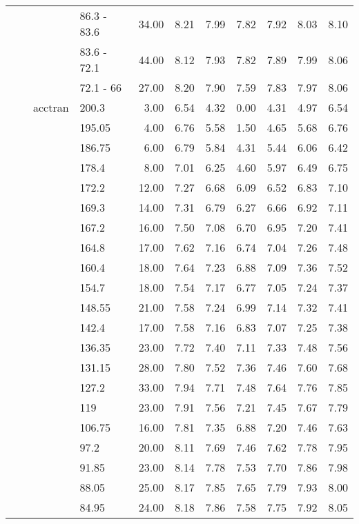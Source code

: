 \begin{longtable}{llllrrrrrrr}
   &  &  & 86.3 - 83.6 & 34.00 & 8.21 & 7.99 & 7.82 & 7.92 & 8.03 & 8.10 \\ 
   &  &  & 83.6 - 72.1 & 44.00 & 8.12 & 7.93 & 7.82 & 7.89 & 7.99 & 8.06 \\ 
   &  &  & 72.1 - 66 & 27.00 & 8.20 & 7.90 & 7.59 & 7.83 & 7.97 & 8.06 \\ 
   &  & acctran & 200.3 & 3.00 & 6.54 & 4.32 & 0.00 & 4.31 & 4.97 & 6.54 \\ 
   &  &  & 195.05 & 4.00 & 6.76 & 5.58 & 1.50 & 4.65 & 5.68 & 6.76 \\ 
   &  &  & 186.75 & 6.00 & 6.79 & 5.84 & 4.31 & 5.44 & 6.06 & 6.42 \\ 
   &  &  & 178.4 & 8.00 & 7.01 & 6.25 & 4.60 & 5.97 & 6.49 & 6.75 \\ 
   &  &  & 172.2 & 12.00 & 7.27 & 6.68 & 6.09 & 6.52 & 6.83 & 7.10 \\ 
   &  &  & 169.3 & 14.00 & 7.31 & 6.79 & 6.27 & 6.66 & 6.92 & 7.11 \\ 
   &  &  & 167.2 & 16.00 & 7.50 & 7.08 & 6.70 & 6.95 & 7.20 & 7.41 \\ 
   &  &  & 164.8 & 17.00 & 7.62 & 7.16 & 6.74 & 7.04 & 7.26 & 7.48 \\ 
   &  &  & 160.4 & 18.00 & 7.64 & 7.23 & 6.88 & 7.09 & 7.36 & 7.52 \\ 
   &  &  & 154.7 & 18.00 & 7.54 & 7.17 & 6.77 & 7.05 & 7.24 & 7.37 \\ 
   &  &  & 148.55 & 21.00 & 7.58 & 7.24 & 6.99 & 7.14 & 7.32 & 7.41 \\ 
   &  &  & 142.4 & 17.00 & 7.58 & 7.16 & 6.83 & 7.07 & 7.25 & 7.38 \\ 
   &  &  & 136.35 & 23.00 & 7.72 & 7.40 & 7.11 & 7.33 & 7.48 & 7.56 \\ 
   &  &  & 131.15 & 28.00 & 7.80 & 7.52 & 7.36 & 7.46 & 7.60 & 7.68 \\ 
   &  &  & 127.2 & 33.00 & 7.94 & 7.71 & 7.48 & 7.64 & 7.76 & 7.85 \\ 
   &  &  & 119 & 23.00 & 7.91 & 7.56 & 7.21 & 7.45 & 7.67 & 7.79 \\ 
   &  &  & 106.75 & 16.00 & 7.81 & 7.35 & 6.88 & 7.20 & 7.46 & 7.63 \\ 
   &  &  & 97.2 & 20.00 & 8.11 & 7.69 & 7.46 & 7.62 & 7.78 & 7.95 \\ 
   &  &  & 91.85 & 23.00 & 8.14 & 7.78 & 7.53 & 7.70 & 7.86 & 7.98 \\ 
   &  &  & 88.05 & 25.00 & 8.17 & 7.85 & 7.65 & 7.79 & 7.93 & 8.00 \\ 
   &  &  & 84.95 & 24.00 & 8.18 & 7.86 & 7.58 & 7.75 & 7.92 & 8.05 \\ 

\end{longtable}
